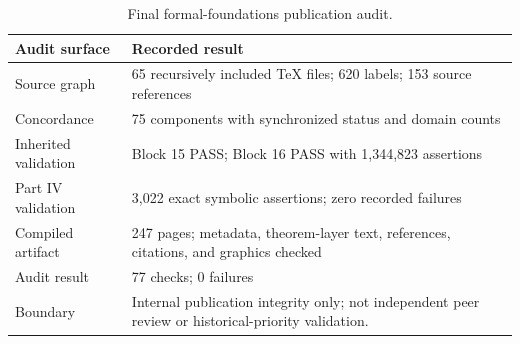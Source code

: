 \begin{table}[htbp]
\centering
\small
\caption{Final formal-foundations publication audit.}
\label{tab:formal-foundations-v2-audit}
\begin{tabularx}{\textwidth}{@{}L{0.31\textwidth}Y@{}}
\toprule
Audit surface & Recorded result\\
\midrule
Source graph & 65 recursively included TeX files; 620 labels; 153 source references\\
Concordance & 75 components with synchronized status and domain counts\\
Inherited validation & Block 15 PASS; Block 16 PASS with 1,344,823 assertions\\
Part IV validation & 3,022 exact symbolic assertions; zero recorded failures\\
Compiled artifact & 247 pages; metadata, theorem-layer text, references, citations, and graphics checked\\
Audit result & 77 checks; 0 failures\\
Boundary & Internal publication integrity only; not independent peer review or historical-priority validation.\\
\bottomrule
\end{tabularx}
\end{table}
